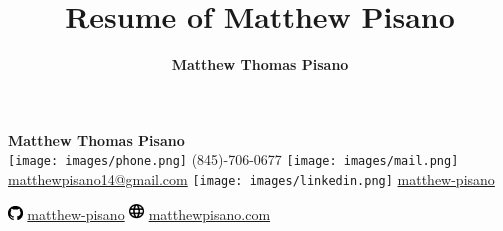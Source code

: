 \documentclass[11pt]{article}
\title{Resume of Matthew Pisano}
\author{\textbf{\LARGE Matthew Thomas Pisano}}
\date{}
\begin{document}
\pagestyle{plain}

\begin{tcolorbox}[width=\linewidth, sharp corners=all, colback=white!90!green, colframe=black]
    
    \begin{center}
        \textbf{\LARGE Matthew Thomas Pisano}\\
        \vspace{0.1in}
        \texttt{[image: images/phone.png]}
        (845)-706-0677 
        \hspace*{0.3in}
        \texttt{[image: images/mail.png]}
        \href{mailto:matthewpisano14@gmail.com}{matthewpisano14@gmail.com} 
        \hspace*{0.5in}
        \texttt{[image: images/linkedin.png]}
        \href{https://www.linkedin.com/in/matthew-pisano/}{matthew-pisano}

        \vspace{0.1in}
        \includegraphics[width=11pt,trim=0 0.4in 0 0]{images/github.png}
        \href{https://github.com/matthew-pisano}{matthew-pisano}
        \hspace*{0.5in}
        \includegraphics[width=11pt,trim=0 0.4in 0 0]{images/website.png}
        \href{https://matthewpisano.com/}{matthewpisano.com}
    \end{center}
    
\end{tcolorbox}

\vspace{0.1in}
\end{document}
